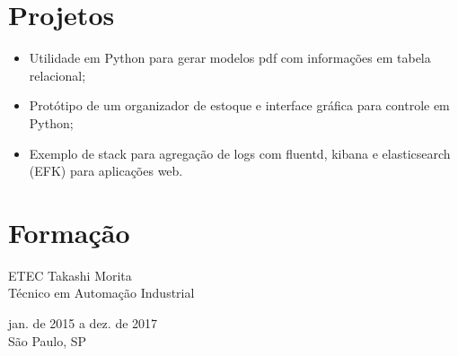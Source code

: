 \documentclass{article}
\begin{document}
\section{Projetos}

\begin{itemize}
    \item Utilidade em Python para gerar modelos pdf com informações em tabela
    relacional;
    \item Protótipo de um organizador de estoque e interface gráfica para
    controle em Python;
    \item Exemplo de stack para agregação de logs com fluentd, kibana e
    elasticsearch (EFK) para aplicações web.
\end{itemize}

\section{Formação}

\begin{multicols}{2}
    \noindent
    \begin{flushleft}
        ETEC Takashi Morita \\
        Técnico em Automação Industrial
    \end{flushleft}
    \columnbreak
    \begin{flushright}
        jan. de 2015 a dez. de 2017 \\
        São Paulo, SP
    \end{flushright}
\end{multicols}
\end{document}
